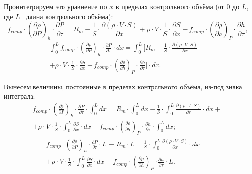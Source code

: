 Проинтегрируем это уравнение по $x$ в пределах контрольного объёма (от $0$ до $L$, где $L$ \textthreequartersemdash\ длина контрольного объёма):
\begin{equation}
\label{formula29}
f_{comp}\cdot\left(\frac{\partial\rho}{\partial P}\right)_{h}\cdot \frac{\partial P}{\partial\tau}=
R_m-\frac 1 S \cdot \frac{\partial(\rho\cdot V\cdot S)}{\partial x}+\rho\cdot V \cdot \frac 1 S \cdot \frac{\partial S}{\partial x}-f_{comp}\cdot\left(\frac{\partial\rho}{\partial h}\right)_{P}\cdot \frac{\partial h}{\partial\tau};
\end{equation}
\begin{eqnarray}
\label{formula210}
\int_{0}^{L} f_{comp}\cdot\left(\frac{\partial\rho}{\partial P}\right)_{h}\cdot \frac{\partial P}{\partial\tau}\cdot dx=
\int_{0}^{L} \bigg[R_m-\frac 1 S \cdot \frac{\partial(\rho\cdot V\cdot S)}{\partial x}+ \nonumber \\
+ \rho\cdot V \cdot \frac 1 S \cdot \frac{\partial S}{\partial x}-f_{comp}\cdot\left(\frac{\partial\rho}{\partial h}\right)_{P}\cdot \frac{\partial h}{\partial\tau}\bigg]\cdot{dx}.
\end{eqnarray}

Вынесем величины, постоянные в пределах контрольного объёма, из-под знака интеграла:
\begin{eqnarray}
\label{formula211}
f_{comp}\cdot\left(\frac{\partial\rho}{\partial P}\right)_{h}\cdot \frac{\partial P}{\partial\tau} \cdot \int_{0}^{L} dx=
R_m \cdot \int_{0}^{L} dx - \frac 1 S \cdot \int_{0}^{L} \frac{\partial(\rho\cdot V\cdot S)}{\partial x} \cdot dx + \nonumber ~\\
+ \rho\cdot V \cdot \frac 1 S \cdot \int_{0}^{L} \frac{\partial S}{\partial x} \cdot dx - f_{comp}\cdot\left(\frac{\partial\rho}{\partial h}\right)_{P}\cdot \frac{\partial h}{\partial\tau} \cdot \int_{0}^{L} dx;
\end{eqnarray}
\begin{eqnarray}
\label{formula212}
f_{comp}\cdot\left(\frac{\partial\rho}{\partial P}\right)_{h}\cdot \frac{\partial P}{\partial\tau} \cdot L=
R_m \cdot L - \frac 1 S \cdot \int_{0}^{L} \frac{\partial(\rho\cdot V\cdot S)}{\partial x} \cdot dx + \nonumber ~\\
+ \rho\cdot V \cdot \frac 1 S \cdot \int_{0}^{L} \frac{\partial S}{\partial x} \cdot dx - f_{comp}\cdot\left(\frac{\partial\rho}{\partial h}\right)_{P}\cdot \frac{\partial h}{\partial\tau} \cdot L.
\end{eqnarray}

